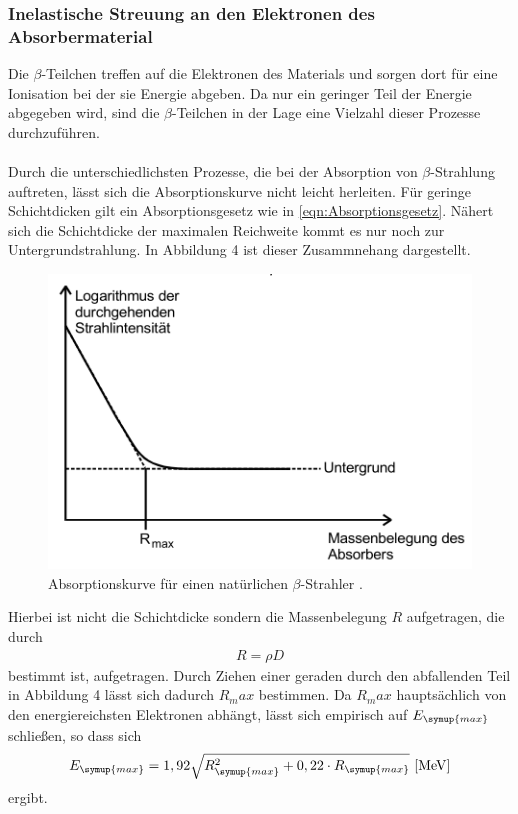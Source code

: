 \subsubsection{Inelastische Streuung an den Elektronen des Absorbermaterial}
\label{sec:inelastischeStreuungAbsorber}
Die $\beta$-Teilchen treffen auf die Elektronen des Materials und sorgen dort für eine Ionisation bei
der sie Energie abgeben. Da nur ein geringer Teil der Energie abgegeben wird, sind die $\beta$-Teilchen
in der Lage eine Vielzahl dieser Prozesse durchzuführen.\\
\\
Durch die unterschiedlichsten Prozesse, die bei der Absorption von $\beta$-Strahlung auftreten, lässt sich
die Absorptionskurve nicht leicht herleiten. Für geringe Schichtdicken gilt ein Absorptionsgesetz wie in
\autoref{eqn:Absorptionsgesetz}. Nähert sich die Schichtdicke der maximalen Reichweite kommt es nur noch
zur Untergrundstrahlung. In Abbildung 4 ist dieser Zusammnehang dargestellt.
\begin{figure}
    \centering
    \label{fig:Absorptionskurveb}
    \includegraphics{Bilder/Absorptionskurve.png}
    \caption{Absorptionskurve für einen natürlichen $\beta$-Strahler \cite{sample}.}
\end{figure}
Hierbei ist nicht die Schichtdicke sondern die Massenbelegung $R$ aufgetragen, die durch
\begin{align}
    \label{eqn:Massenbelegung}
    R = \rho D
\end{align}
bestimmt ist, aufgetragen. Durch Ziehen einer geraden durch den abfallenden Teil in Abbildung 4 lässt sich
dadurch $R_max$ bestimmen. Da $R_max$ hauptsächlich von den energiereichsten Elektronen abhängt, lässt sich
empirisch auf $E_{\symup{max}}$ schließen, so dass sich
\begin{align}
    \label{eqn:emax}
    E_{\symup{max}} = 1,92 \sqrt{R_{\symup{max}}^2 + 0,22\cdot R_{\symup{max}}} \,\, [\unit{\mega\eV}]
\end{align}
ergibt.